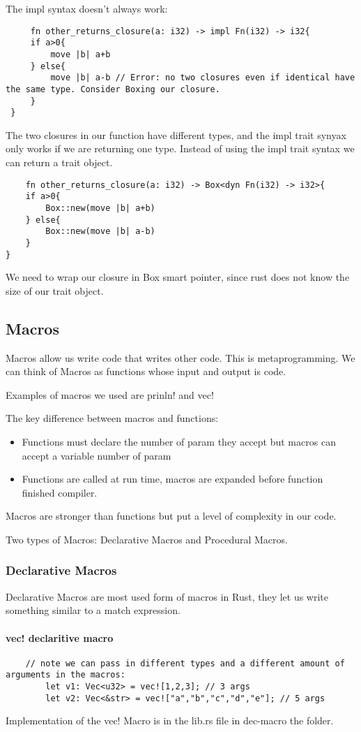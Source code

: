 The impl syntax doesn't always work:\begin{lstlisting}
     fn other_returns_closure(a: i32) -> impl Fn(i32) -> i32{
     if a>0{
         move |b| a+b
     } else{
         move |b| a-b // Error: no two closures even if identical have the same type. Consider Boxing our closure.
     }
 }
\end{lstlisting}
The two closures in our function have different types, and the impl trait synyax only works if we are returning one type. Instead of using the impl trait syntax we can return a trait object. 

\begin{lstlisting}
    fn other_returns_closure(a: i32) -> Box<dyn Fn(i32) -> i32>{
    if a>0{
        Box::new(move |b| a+b)
    } else{
        Box::new(move |b| a-b) 
    }
}
\end{lstlisting}
We need to wrap our closure in Box smart pointer, since rust does not know the size of our trait object.

\subsection{Macros}
Macros allow us write code that writes other code. This is metaprogramming. We can think of Macros as functions whose input and output is code.

Examples of macros we used are prinln! and vec!

The key difference between macros and functions:\begin{itemize}
    \item Functions must declare the number of param they accept but macros can accept a variable number of param
    \item Functions are called at run time, macros are expanded before function finished compiler. 
\end{itemize}
Macros are stronger than functions but put a level of complexity in our code.

Two types of Macros: Declarative Macros and Procedural Macros.
\subsubsection{Declarative Macros}
Declarative Macros are most used form of macros in Rust, they let us write something similar to a match expression. 

\paragraph*{vec! declaritive macro}\begin{lstlisting}
    // note we can pass in different types and a different amount of arguments in the macros:
        let v1: Vec<u32> = vec![1,2,3]; // 3 args
        let v2: Vec<&str> = vec!["a","b","c","d","e"]; // 5 args
\end{lstlisting}
Implementation of the vec! Macro is in the lib.rs file in dec-macro the folder. 

